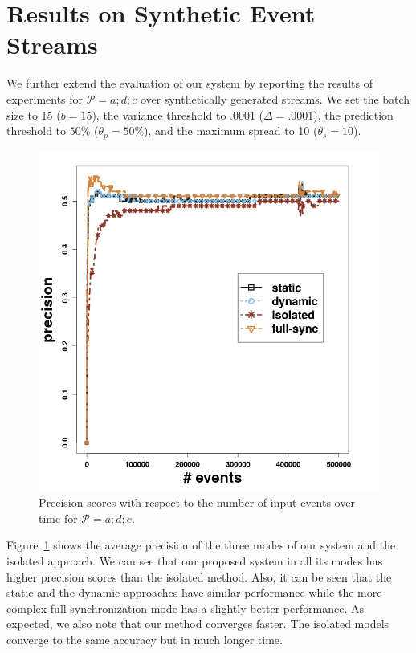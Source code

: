 \section{Results on Synthetic Event Streams}
\label{sec:results_synthetic}

We further extend the evaluation of our system by reporting the results of experiments for $\mathcal{P}=a ; d ; c$ over synthetically generated streams. We set the batch size to 15 ($b=15$), the variance threshold to .0001 ($\Delta=.0001$), the  \pmcmr prediction threshold to $50\%$ ($\theta_{p}=50\%$), and the maximum spread to 10 ($\theta_{s}=10$).

\begin{figure}[H]
	\centering
	\includegraphics[width=\textwidth]{chapters/figures/synthetic/precision_synthetic_15_0001.png}
	
	\caption{Precision scores with respect to the number of input events over time for $\mathcal{P}=a;d;c$.}
	\label{fig:precsion_synthetic}
\end{figure}

\par Figure~\ref{fig:precsion_synthetic} shows the average precision of the three modes of our system and the isolated approach. We can see that our proposed system in all its modes has higher precision scores than the isolated method. Also, it can be seen that the static and the dynamic approaches have similar performance while the more complex full synchronization mode has a slightly better performance. As expected, we also note that our method converges faster. The isolated models converge to the same accuracy but in much longer time.

